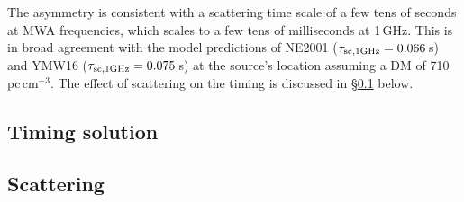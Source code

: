 \documentclass[preprint2,linenumbers]{aastex631}
\begin{document}
The asymmetry is consistent with a scattering time scale of a few tens of seconds at MWA frequencies, which scales to a few tens of milliseconds at 1\,GHz.
This is in broad agreement with the model predictions of NE2001 ($\tau_{\rm sc,1 GHz} = 0.066\,$s) and YMW16 ($\tau_{\rm sc,1 GHz} = 0.075\,$s) at the source's location assuming a DM of 710\,pc\,cm$^{-3}$.
The effect of scattering on the timing is discussed in \S\ref{sec:timing} below.

\subsection{Timing solution} \label{sec:timing}




\subsection{Scattering}
\end{document}
